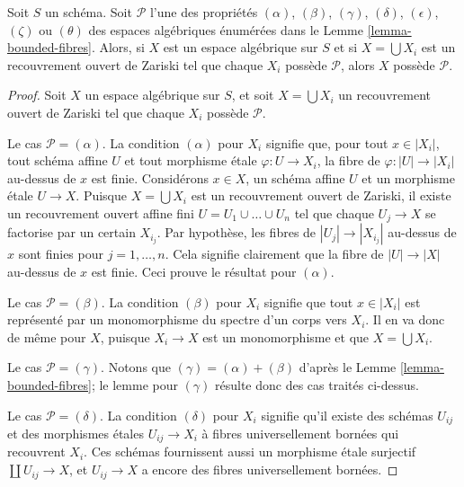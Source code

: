 \begin{lemma}
\label{lemma-properties-local}
Soit $S$ un schéma.
Soit $\mathcal{P}$ l'une des propriétés
$(\alpha)$, $(\beta)$, $(\gamma)$, $(\delta)$, $(\epsilon)$, $(\zeta)$ ou
$(\theta)$ des espaces algébriques énumérées dans le
Lemme \ref{lemma-bounded-fibres}.
Alors, si $X$ est un espace algébrique sur $S$ et si
$X = \bigcup X_i$ est un recouvrement ouvert de Zariski tel que chaque
$X_i$ possède $\mathcal{P}$, alors $X$ possède $\mathcal{P}$.
\end{lemma}

\begin{proof}
Soit $X$ un espace algébrique sur $S$, et soit $X = \bigcup X_i$ un
recouvrement ouvert de Zariski tel que chaque $X_i$ possède $\mathcal{P}$.

\medskip\noindent
Le cas $\mathcal{P} = (\alpha)$. La condition $(\alpha)$ pour $X_i$
signifie que, pour tout $x \in |X_i|$, tout schéma affine $U$ et tout
morphisme étale $\varphi : U \to X_i$, la fibre de
$\varphi : |U| \to |X_i|$ au-dessus de $x$ est finie. Considérons
$x \in X$, un schéma affine $U$ et un morphisme étale $U \to X$.
Puisque $X = \bigcup X_i$ est un recouvrement ouvert de Zariski, il existe
un recouvrement ouvert affine fini $U = U_1 \cup \ldots \cup U_n$ tel que
chaque $U_j \to X$ se factorise par un certain $X_{i_j}$. Par hypothèse,
les fibres de $|U_j | \to |X_{i_j}|$ au-dessus de $x$ sont finies pour
$j = 1, \ldots, n$. Cela signifie clairement que la fibre de
$|U| \to |X|$ au-dessus de $x$ est finie.
Ceci prouve le résultat pour $(\alpha)$.

\medskip\noindent
Le cas $\mathcal{P} = (\beta)$. La condition $(\beta)$ pour $X_i$ signifie
que tout $x \in |X_i|$ est représenté par un monomorphisme du spectre
d'un corps vers $X_i$. Il en va donc de même pour $X$, puisque
$X_i \to X$ est un monomorphisme et que $X = \bigcup X_i$.

\medskip\noindent
Le cas $\mathcal{P} = (\gamma)$.
Notons que $(\gamma) = (\alpha) + (\beta)$ d'après le
Lemme \ref{lemma-bounded-fibres}; le lemme pour $(\gamma)$ résulte donc
des cas traités ci-dessus.

\medskip\noindent
Le cas $\mathcal{P} = (\delta)$. La condition $(\delta)$ pour $X_i$ signifie
qu'il existe des schémas $U_{ij}$ et des morphismes étales
$U_{ij} \to X_i$ à fibres universellement bornées qui recouvrent $X_i$.
Ces schémas fournissent aussi un morphisme étale surjectif
$\coprod U_{ij} \to X$, et $U_{ij} \to X$ a encore des fibres
universellement bornées.


\end{proof}
